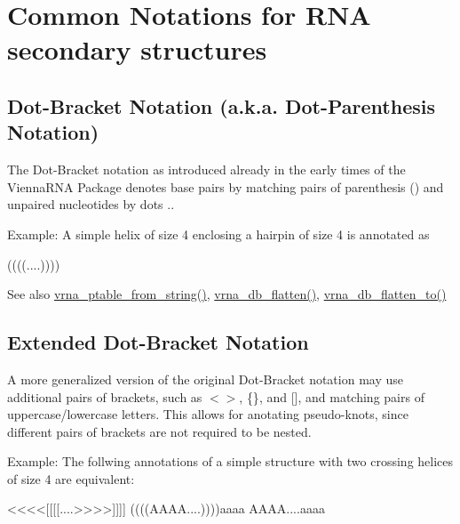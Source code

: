 \hypertarget{rna_structure_notations_secondary-structure-notations}{}\section{Common Notations for R\+N\+A secondary structures}\label{rna_structure_notations_secondary-structure-notations}
\hypertarget{rna_structure_notations_dot-bracket-notation}{}\subsection{Dot-\/\+Bracket Notation (a.\+k.\+a. Dot-\/\+Parenthesis Notation)}\label{rna_structure_notations_dot-bracket-notation}
The Dot-\/\+Bracket notation as introduced already in the early times of the Vienna\+R\+NA Package denotes base pairs by matching pairs of parenthesis {\ttfamily ()} and unpaired nucleotides by dots {\ttfamily .}.

Example\+: A simple helix of size 4 enclosing a hairpin of size 4 is annotated as \begin{DoxyVerb}((((....))))
\end{DoxyVerb}


\begin{DoxySeeAlso}{See also}
\hyperlink{group__struct__utils_gac76c9ef3de507748fb0416a59323362b}{vrna\+\_\+ptable\+\_\+from\+\_\+string()}, \hyperlink{group__struct__utils_gae966b9f44168a4f4b39ca42ffb5f37b7}{vrna\+\_\+db\+\_\+flatten()}, \hyperlink{group__struct__utils_ga690425199c8b71545e7196e3af1436f8}{vrna\+\_\+db\+\_\+flatten\+\_\+to()}
\end{DoxySeeAlso}
\hypertarget{rna_structure_notations_dot-bracket-ext-notation}{}\subsection{Extended Dot-\/\+Bracket Notation}\label{rna_structure_notations_dot-bracket-ext-notation}
A more generalized version of the original Dot-\/\+Bracket notation may use additional pairs of brackets, such as {\ttfamily $<$$>$}, {\ttfamily \{\}}, and {\ttfamily \mbox{[}\mbox{]}}, and matching pairs of uppercase/lowercase letters. This allows for anotating pseudo-\/knots, since different pairs of brackets are not required to be nested.

Example\+: The follwing annotations of a simple structure with two crossing helices of size 4 are equivalent\+: \begin{DoxyVerb}<<<<[[[[....>>>>]]]]
((((AAAA....))))aaaa
AAAA{{{{....aaaa}}}}
\end{DoxyVerb}


